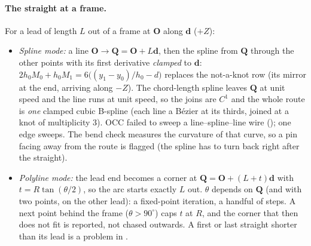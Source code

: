 \paragraph{The straight at a frame.} For a lead of length $L$ out of a frame at $\mathbf O$ along $\mathbf d$ ($+Z$):
\begin{itemize}[nosep]
  \item \emph{Spline mode:} a line $\mathbf O\to\mathbf Q=\mathbf O+L\mathbf d$, then the spline from $\mathbf Q$
        through the other points with its first derivative \emph{clamped} to $\mathbf d$:
        $2h_0M_0+h_0M_1=6\bigl((y_1-y_0)/h_0-d\bigr)$ replaces the not-a-knot row (its mirror at the end, arriving
        along $-Z$). The chord-length spline leaves $\mathbf Q$ at unit speed and the line runs at unit speed, so the
        joins are $C^1$ and the whole route is \emph{one} clamped cubic B-spline (each line a Bézier at its thirds,
        joined at a knot of multiplicity 3). OCC failed to sweep a line--spline--line wire
        (); one edge sweeps. The bend check measures the curvature of that curve,
        so a pin facing away from the route is flagged (the spline has to turn back right after the straight).
  \item \emph{Polyline mode:} the lead end becomes a corner at $\mathbf Q=\mathbf O+(L+t)\mathbf d$ with
        $t=R\tan(\theta/2)$, so the arc starts exactly $L$ out. $\theta$ depends on $\mathbf Q$ (and with two points,
        on the other lead): a fixed-point iteration, a handful of steps. A next point behind the frame
        ($\theta>90^\circ$) caps $t$ at $R$, and the corner that then does not fit is reported, not chased outwards.
        A first or last straight shorter than its lead is a problem in .
\end{itemize}

